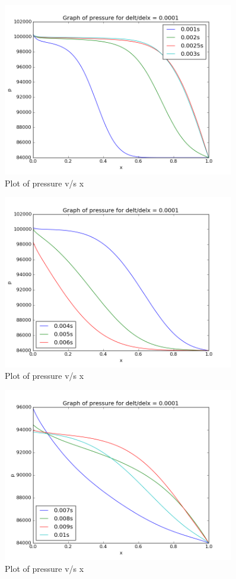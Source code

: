 \documentclass[11pt, a4paper]{article}
\begin{document}
\begin{figure}[H]
 \centering
 \includegraphics[width = 0.9\textwidth]{lax_fed_1_7.png}
 \caption{Plot of pressure v/s x}
\end{figure}
\begin{figure}[H]
 \centering
 \includegraphics[width = 0.9\textwidth]{lax_fed_1_8.png}
 \caption{Plot of pressure v/s x}
\end{figure}
\begin{figure}[H]
 \centering
 \includegraphics[width = 0.9\textwidth]{lax_fed_1_9.png}
 \caption{Plot of pressure v/s x}
\end{figure}
\end{document}
